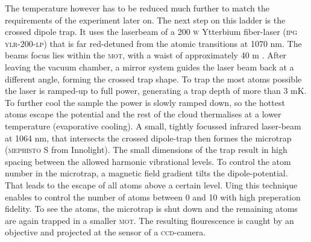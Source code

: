 The temperature however has to be reduced much further to match the requirements of the experiment later on. The next step on this ladder is the crossed dipole trap. 
It uses the laserbeam of a 200 \textsc{w} Ytterbium fiber-laser (\textsc{ipg ylr-200-lp}) that is far red-detuned from the atomic transitions at 1070 nm. The beams focus lies within the \textsc{mot}, with a waist of approximately 40 \mu m \cite{lompe}. After leaving the vacuum chamber, a mirror system guides the laser beam back at a different angle, forming the crossed trap shape. To trap the most atoms possible the laser is ramped-up to full power, generating a trap depth of more than 3 mK. To further cool the sample the power is slowly ramped down, so the hottest atoms escape the potential and the rest of the cloud thermalises at a lower temperature (evaporative cooling). A small, tightly focussed infrared laser-beam at 1064 nm, that intersects the crossed dipole-trap then formes the microtrap (\textsc{mephisto S} from Innolight). The small dimensions of the trap result in high spacing between the allowed harmonic vibrational levels. To control the atom number in the microtrap, a magnetic field gradient tilts the dipole-potential. That leads to the escape of all atoms above a certain level. Uing this technique enables to control the number of atoms between 0 and 10 with high preperation fidelity. To see the atoms, the microtrap is shut down and the remaining atoms are again trapped in a smaller \textsc{mot}. The resulting flourescence is caught by an objective and projected at the sensor of a \textsc{ccd}-camera. 
